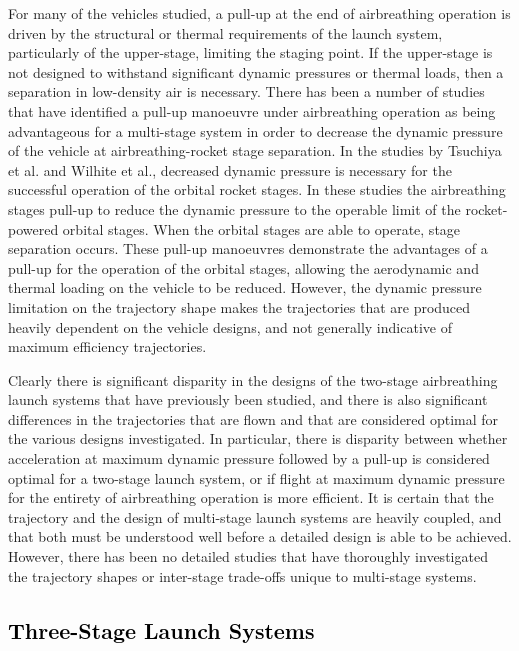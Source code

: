 For many of the vehicles studied, a pull-up at the end of airbreathing operation is driven by the structural or thermal requirements of the launch system, particularly of the upper-stage, limiting the staging point. If the upper-stage is not designed to withstand significant dynamic pressures or thermal loads, then a separation in low-density air is necessary. 
There has been a number of studies that have identified a pull-up manoeuvre under airbreathing operation as being advantageous for a multi-stage system in order to decrease the dynamic pressure of the vehicle at airbreathing-rocket stage separation\cite{Tsuchiya2005,Wilhite1991,Mehta2001}. 
In the studies by Tsuchiya et al.\cite{Tsuchiya2005} and Wilhite et al.\cite{Wilhite1991}, decreased dynamic pressure is necessary for the successful operation of the orbital rocket stages. In these studies the airbreathing stages pull-up to reduce the dynamic pressure to the operable limit of the rocket-powered orbital stages. When the orbital stages are able to operate, stage separation occurs. These pull-up manoeuvres demonstrate the advantages of a pull-up for the operation of the orbital stages, allowing the aerodynamic and thermal loading on the vehicle to be reduced. However, the dynamic pressure limitation on the trajectory shape makes the trajectories that are produced heavily dependent on the vehicle designs, and not generally indicative of maximum efficiency trajectories. 



Clearly there is significant disparity in the designs of the two-stage airbreathing launch systems that have previously been studied, and there is also significant differences in the trajectories that are flown and that are considered optimal for the various designs investigated.
In particular, there is disparity between whether acceleration at maximum dynamic pressure followed by a pull-up is considered optimal for a two-stage launch system, or if flight at maximum dynamic pressure for the entirety of airbreathing operation is more efficient.
It is certain that the trajectory and the design of multi-stage launch systems are heavily coupled, and that both must be understood well before a detailed design is able to be achieved. However, there has been no detailed studies that have thoroughly investigated the trajectory shapes or inter-stage trade-offs unique to multi-stage systems. 



  \textcolor{black}{
  \subsection{Three-Stage Launch Systems}\label{sec:threestage}
}
	
